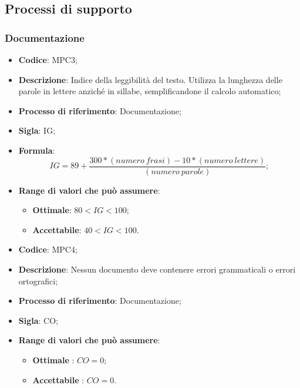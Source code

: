 \subsection{Processi di supporto}
\subsubsection{Documentazione}
\vspace{-1cm}
\begin{itemize}
	\item \textbf{Codice}: MPC3;
	\item \textbf{Descrizione}: Indice della leggibilità del testo. Utilizza la lunghezza delle parole in lettere anziché in sillabe, semplificandone il calcolo automatico;
	\item \textbf{Processo di riferimento}: Documentazione;
	\item \textbf{Sigla}: IG;
	\item \textbf{Formula}: \[ IG = 89 + \frac{300 \ast (numero \ frasi) - 10 \ast (numero \ lettere)}{(numero \ parole)}; \]
	\item \textbf{Range di valori che può assumere}:
		\begin{itemize}
			\item \textbf{Ottimale}: $80 < IG < 100$;
			\item \textbf{Accettabile}: $40 < IG < 100$.
		\end{itemize}
\end{itemize}
\vspace{-1cm}
\begin{itemize}
	\item \textbf{Codice}: MPC4;
	\item \textbf{Descrizione}: Nessun documento deve contenere errori grammaticali o errori ortografici;
	\item \textbf{Processo di riferimento}: Documentazione;
	\item \textbf{Sigla}: CO;
	\item \textbf{Range di valori che può assumere}:
		\begin{itemize}
			\item \textbf{Ottimale} : $CO = 0$;
			\item \textbf{Accettabile} : $CO = 0$.
		\end{itemize}
\end{itemize}

